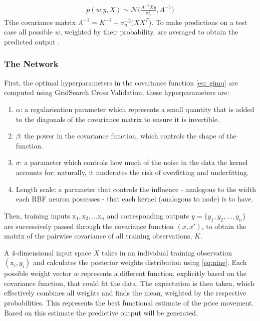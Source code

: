 \documentclass[11pt,a4paper]{article}
\begin{document}
\begin{align}
    p(w|y, X) \sim \mathcal{N}\bigl(\frac{A^{-1}Xy}{\sigma_{n}^{2}}, A^{-1}\bigr) \label{eq:nine}
\end{align}
Tthe covariance matrix $A^{-1} = K^{-1} + \sigma_{n}^{-2}(XX^T$).
To make predictions on a test case all possible $w$, weighted by their probability, are averaged to obtain the
predicted output \citep{rasmussen2006}.

\subsubsection{The Network}


First, the optimal hyperparameters in the covariance function \eqref{eq: gimq} 
are computed using GridSearch Cross Validation; these hyperparameters are:
\begin{enumerate}
    \item $\alpha$: a regularisation parameter which represents a small quantity
    that is added to the diagonals of the covariance matrix to ensure it is 
    invertible. 
    \item $\beta$: the power in the covariance function, which controls the shape of the function.
    \item $\sigma$: a parameter which controls how much of the noise in the data the kernel accounts for; naturally, 
    it moderates the risk of overfitting and underfitting.
    \item Length scale: a parameter that controls the influence - analogous to 
    the width each RBF neuron possesses - that each kernel (analogous to node) is to have.
\end{enumerate}

Then, training inputs $\boldsymbol{\mathrm{x}}_1, \boldsymbol{\mathrm{x}}_2,\ldots \boldsymbol{\mathrm{x}}_{n}$
and corresponding outputs \( y = \{y_1, y_2, \dots, y_n\} \) are successively passed through the 
covariance function $(x,x')$, to obtain the matrix of the pairwise covariance of 
all training observations, $K$.

A $4$-dimensional input space $X$ takes in an individual training observation $(\boldsymbol{\mathrm{x}}_{i}, y_i)$ and 
calculates the posterior weights distribution using \eqref{eq:nine}. 
Each possible weight vector $w$ represents a different function, explicitly 
based on the covariance function, that could fit the data. The expectation is then taken, which
effectively combines all weights and finds the mean, weighted by the 
respective probabilities. This represents the best functional estimate of the price movement. Based on this estimate 
the predictive output will be generated.
\end{document}
